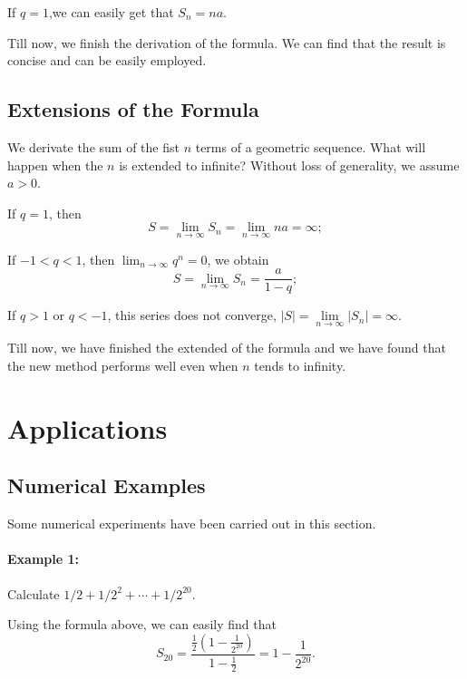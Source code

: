 If $q = 1$,we can easily get that $S_n = na$.

Till now, we finish the derivation of the formula. We can find that the result is concise and can be easily employed.


\subsection{Extensions of the Formula}
We derivate the sum of the fist $n$ terms of a geometric sequence. What will happen when the $n$ is extended to infinite? Without loss of generality, we assume $a>0$.

If $q=1$, then
\begin{equation*}
    S = \lim_{n\to\infty} S_n = \lim_{n\to\infty} na = \infty;
\end{equation*}

If $-1<q<1$, then $\lim_{n\to\infty}q^n=0$, we obtain
\begin{equation*}
    S = \lim_{n\to\infty} S_n = \frac{a}{1-q};
\end{equation*}

If $q>1$ or $q<-1$, this series does not converge, $\left| S \right| = \mathop {\lim }\limits_{n \to \infty } \left| {{S_n}} \right| = \infty$.

Till now, we have finished the extended of the formula and we have found that the new method performs well even when $n$ tends to infinity.



\section{Applications}\label{S:applications}
\subsection{Numerical Examples}
Some numerical experiments have been carried out in this section.

\paragraph{Example 1:} Calculate $1/2+1/2^2+\cdots+1/2^{20}$.

Using the formula above, we can easily find that
\begin{equation*}
    S_{20} = \frac{\frac{1}{2}\left(1-\frac{1}{2^{20}}\right)}{1-\frac{1}{2}} = 1 - \frac{1}{2^{20}}.
\end{equation*}

